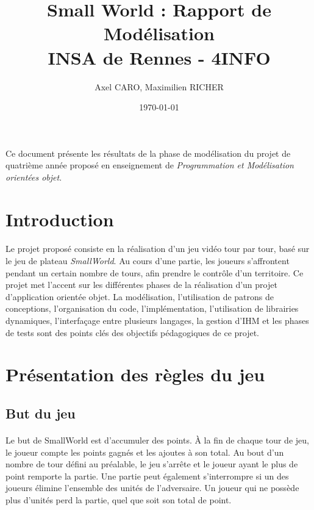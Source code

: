 \documentclass[a4paper]{article}
\title{Small World : Rapport de Modélisation \\ INSA de Rennes - 4INFO}
\author{Axel CARO, Maximilien RICHER}
\date{\today}
\begin{document}
\maketitle

\paragraph{}
Ce document présente les résultats de la phase de modélisation du projet de quatrième année proposé en enseignement de \textit{Programmation et Modélisation orientées objet}.

\section*{Introduction}
\paragraph{}
Le projet proposé consiste en la réalisation d'un jeu vidéo tour par tour, basé sur le jeu de plateau \textit{SmallWorld}. Au cours d'une partie, les joueurs s'affrontent pendant un certain nombre de tours, afin prendre le contrôle d'un territoire. Ce projet met l'accent sur les différentes phases de la réalisation d'un projet d'application orientée objet. La modélisation, l'utilisation de patrons de conceptions, l'organisation du code, l'implémentation, l'utilisation de librairies dynamiques, l'interfaçage entre plusieurs langages, la gestion d'IHM et les phases de tests sont des points clés des objectifs pédagogiques de ce projet.

\section{Présentation des règles du jeu}
\paragraph{}

\subsection{But du jeu}
\paragraph{}
Le but de SmallWorld est d'accumuler des points.
À la fin de chaque tour de jeu, le joueur compte les points gagnés et les ajoutes à son total. Au bout d'un nombre de tour défini au préalable, le jeu s'arrête et le joueur ayant le plus de point remporte la partie. Une partie peut également s'interrompre si un des joueurs élimine l'ensemble des unités de l'adversaire. Un joueur qui ne possède plus d'unités perd la partie, quel que soit son total de point.
\end{document}
